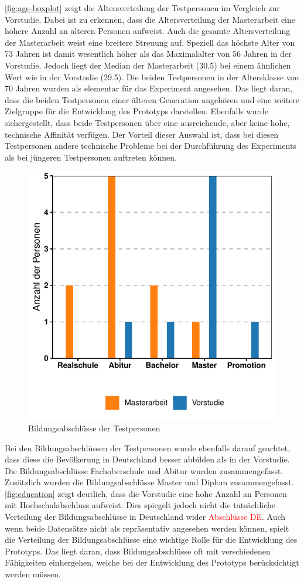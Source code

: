\autoref{fig:age-boxplot} zeigt die Altersverteilung der Testpersonen im Vergleich zur Vorstudie.
Dabei ist zu erkennen, dass die Altersverteilung der Masterarbeit eine höhere Anzahl an älteren Personen aufweist.
Auch die gesamte Altersverteilung der Masterarbeit weist eine breitere Streuung auf.
Speziell das höchste Alter von 73 Jahren ist damit wesentlich höher als das Maximalalter von 56 Jahren in der Vorstudie.
Jedoch liegt der Median der Masterarbeit (30.5) bei einem ähnlichen Wert wie in der Vorstudie (29.5).
Die beiden Testpersonen in der Altersklasse von 70 Jahren wurden als elementar für das Experiment angesehen.
Das liegt daran, dass die beiden Testpersonen einer älteren Generation angehören und eine weitere Zielgruppe für die Entwicklung des Prototyps darstellen.
Ebenfalls wurde sichergestellt, dass beide Testpersonen über eine ausreichende, aber keine hohe, technische Affinität verfügen.
Der Vorteil dieser Auswahl ist, dass bei diesen Testpersonen andere technische Probleme bei der Durchführung des Experiments als bei jüngeren Testpersonen auftreten können.\\

\begin{figure}[!ht]
    \centering
    \includegraphics[width=0.7\columnwidth]{figures/education.pdf}
    \caption{\label{fig:education}Bildungsabschlüsse der Testpersonen}
\end{figure}

Bei den Bildungsabschlüssen der Testpersonen wurde ebenfalls darauf geachtet, dass diese die Bevölkerung in Deutschland besser abbilden als in der Vorstudie.
Die Bildungsabschlüsse Fachoberschule und Abitur wurden zusammengefasst.
Zusätzlich wurden die Bildungsabschlüsse Master und Diplom zusammengefasst.
\autoref{fig:education} zeigt deutlich, dass die Vorstudie eine hohe Anzahl an Personen mit Hochschulabschluss aufweist.
Dies spiegelt jedoch nicht die tatsächliche Verteilung der Bildungsabschlüsse in Deutschland wider \textcolor{red}{Abschlüsse DE}.
Auch wenn beide Datensätze nicht als repräsentativ angesehen werden können, spielt die Verteilung der Bildungsabschlüsse eine wichtige Rolle für die Entwicklung des Prototyps.
Das liegt daran, dass Bildungsabschlüsse oft mit verschiedenen Fähigkeiten einhergehen, welche bei der Entwicklung des Prototyps berücksichtigt werden müssen.
